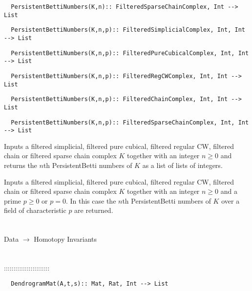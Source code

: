 \documentclass[a4paper,11pt]{report}
\begin{document}
{\begin{verbatim}  PersistentBettiNumbers(K,n):: FilteredSparseChainComplex, Int --> List
\end{verbatim}
 
\begin{verbatim}  PersistentBettiNumbers(K,n,p):: FilteredSimplicialComplex, Int, Int --> List
\end{verbatim}
 
\begin{verbatim}  PersistentBettiNumbers(K,n,p):: FilteredPureCubicalComplex, Int, Int --> List
\end{verbatim}
 
\begin{verbatim}  PersistentBettiNumbers(K,n,p):: FilteredRegCWComplex, Int, Int --> List
\end{verbatim}
 
\begin{verbatim}  PersistentBettiNumbers(K,n,p):: FilteredChainComplex, Int, Int --> List
\end{verbatim}
 
\begin{verbatim}  PersistentBettiNumbers(K,n,p):: FilteredSparseChainComplex, Int, Int --> List
\end{verbatim}
 

Inputs a filtered simplicial, filtered pure cubical, filtered regular CW,
filtered chain or filtered sparse chain complex $K$ together with an integer $n \ge 0$ and returns the $n$th PersistentBetti numbers of $K$ as a list of lists of integers. 

Inputs a filtered simplicial, filtered pure cubical, filtered regular CW,
filtered chain or filtered sparse chain complex $K$ together with an integer $n \ge 0$ and a prime $p \ge 0$ or $p=0$. In this case the $n$th PersistentBetti numbers of $K$ over a field of characteristic $p$ are returned. \\
 \\
 \\
 Data $\longrightarrow$ Homotopy Invariants \\
 \\
 \\
 ::::::::::::::::::::::::\\
 
\begin{verbatim}  DendrogramMat(A,t,s):: Mat, Rat, Int --> List
\end{verbatim}


}
\end{document}
